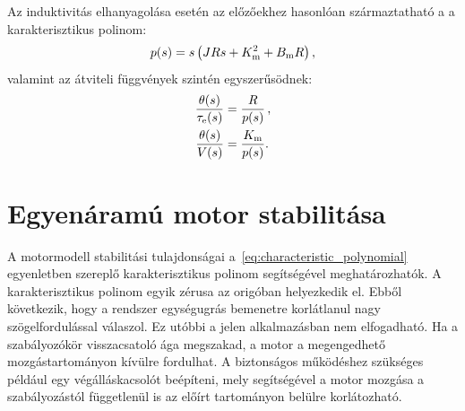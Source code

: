 Az induktivitás elhanyagolása esetén az előzőekhez hasonlóan származtatható a a karakterisztikus polinom:
\begin{align}\label{eq:characteristic_polynomial}
    p(s) = s\left(JRs + K_{\mathrm{m}}^2 + B_{\mathrm{m}} R\right),
\end{align}
valamint az átviteli függvények szintén egyszerűsödnek:
\begin{equation}\label{eq:transfer_function}
    \begin{split}
        \frac{\theta(s)}{\tau_{\mathrm{e}}(s)} &= \frac{R}{p(s)}\,,\\
        \frac{\theta(s)}{V(s)} &= \frac{K_{\mathrm{m}}}{p(s)}.
    \end{split}
\end{equation}

\section{Egyenáramú motor stabilitása}
A motormodell stabilitási tulajdonságai a~\eqref{eq:characteristic_polynomial} egyenletben szereplő karakterisztikus 
polinom segítségével meghatározhatók.
A karakterisztikus polinom egyik zérusa az origóban helyezkedik el. Ebből következik, hogy a rendszer
egységugrás bemenetre korlátlanul nagy szögelfordulással válaszol. Ez utóbbi a jelen alkalmazásban nem elfogadható. 
Ha a szabályozókör visszacsatoló ága megszakad, a motor a megengedhető mozgástartományon kívülre fordulhat.
A biztonságos működéshez szükséges például egy végálláskacsolót beépíteni, mely segítségével a motor 
mozgása a szabályozástól függetlenül is az előírt tartományon belülre korlátozható.

